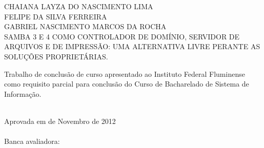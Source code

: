 \begin{folhadeaprovacao}
    \setlength{\ABNTsignthickness}{0.4pt}
    \setlength{\ABNTsignwidth}{15cm}
    \setlength{\ABNTsignskip}{0.9cm}
    \begin{center}
	{\large CHAIANA LAYZA DO NASCIMENTO LIMA} \\
	{\large FELIPE DA SILVA FERREIRA} \\	
	{\large GABRIEL NASCIMENTO MARCOS DA ROCHA} \\ [4cm]
	{\large SAMBA 3 E 4 COMO CONTROLADOR DE DOMÍNIO, SERVIDOR DE ARQUIVOS E DE 	IMPRESSÃO: UMA ALTERNATIVA LIVRE PERANTE AS SOLUÇÕES PROPRIETÁRIAS.}\\ [2cm]
        \hspace{.45\textwidth} %
        \begin{minipage}{0.5\textwidth}
        \begin{espacosimples}
        Trabalho de conclusão de curso apresentado ao Instituto Federal Fluminense como requisito parcial para conclusão do Curso de Bacharelado de Sistema de Informação.\\\\
        \end{espacosimples}
        \end{minipage}
    \end{center}
    Aprovada em  de Novembro de 2012 \\\\
    Banca avaliadora:
\end{folhadeaprovacao}
